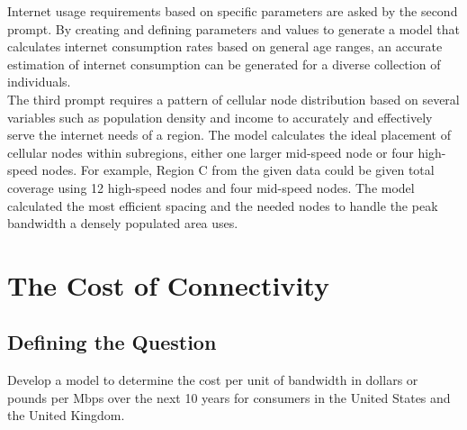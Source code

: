 	\indent Internet usage requirements based on specific parameters are asked by the second prompt. By creating and defining parameters and values to generate a model that calculates internet consumption rates based on general age ranges, an accurate estimation of internet consumption can be generated for a diverse collection of individuals.\\
	\indent The third prompt requires a pattern of cellular node distribution based on several variables such as population density and income to accurately and effectively serve the internet needs of a region. The model calculates the ideal placement of cellular nodes within subregions, either one larger mid-speed node or four high-speed nodes. For example, Region C from the given data could be given total coverage using 12 high-speed nodes and four mid-speed nodes. The model calculated the most efficient spacing and the needed nodes to handle the peak bandwidth a densely populated area uses. 

 
\section*{The Cost of Connectivity}
	\subsection*{Defining the Question}
	Develop a model to determine the cost per unit of bandwidth in dollars or pounds per Mbps over the next 10 years for consumers in the United States and the United Kingdom.
		
